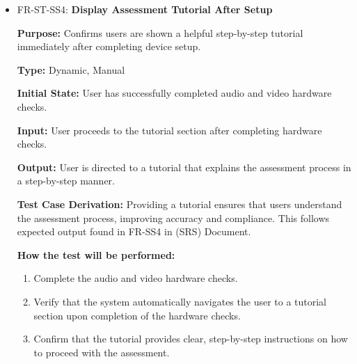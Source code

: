 \documentclass[12pt, titlepage]{article}
\begin{document}
\begin{itemize}
  \item FR-ST-SS4: \textbf{Display Assessment Tutorial After Setup}
  \begin{mdframed}[linewidth=0.5mm]
      \textbf{Purpose:} Confirms users are shown a helpful step-by-step tutorial immediately after completing device setup. \par
      \textbf{Type:} Dynamic, Manual \par
      \textbf{Initial State:} User has successfully completed audio and video hardware checks. \par
      \textbf{Input:} User proceeds to the tutorial section after completing hardware checks. \par
      \textbf{Output:} User is directed to a tutorial that explains the assessment process in a step-by-step manner. \par
      \textbf{Test Case Derivation:} Providing a tutorial ensures that users understand the assessment process,
       improving accuracy and compliance. This follows expected output found in FR-SS4 in (SRS) Document. \par
      \textbf{How the test will be performed:}
      \begin{enumerate}[noitemsep]
        \item Complete the audio and video hardware checks.
        \item Verify that the system automatically navigates the user to a tutorial section upon completion of the hardware checks.
        \item Confirm that the tutorial provides clear, step-by-step instructions on how to proceed with the assessment.
      \end{enumerate}
  \end{mdframed}


\end{itemize}
\end{document}
